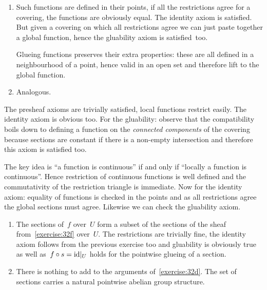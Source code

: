 \begin{exercise}
  \label{exercise:32d}
  \begin{enumerate}
    \item Such functions are defined in their points, if all the restrictions agree for a covering, the functions are obviously equal. The identity axiom is satisfied. But given a covering on which all restrictions agree we can just paste together a global function, hence the gluability axiom is satisfied~too.

      Glueing functions preserves their extra properties: these are all defined in a neighbourhood of a point, hence valid in an open set and therefore lift to the global function.

    \item Analogous.
  \end{enumerate}
\end{exercise}

\begin{exercise}
  The presheaf axioms are trivially satisfied, local functions restrict easily. The identity axiom is obvious too. For the gluability: observe that the compatibility boils down to defining a function on the \emph{connected components} of the covering because sections are constant if there is a non-empty intersection and therefore this axiom is satisfied too.
\end{exercise}

\begin{exercise}
  \label{exercise:32f}
 The key idea is ``a function is continuous'' if and only if ``locally a function is continuous''. Hence restriction of continuous functions is well defined and the commutativity of the restriction triangle is immediate. Now for the identity axiom: equality of functions is checked in the points and as all restrictions agree the global sections must agree. Likewise we can check the gluability axiom.
\end{exercise}

\begin{exercise}
  \begin{enumerate}
    \item The sections of~$f$ over~$U$ form a subset of the sections of the sheaf from~\autoref{exercise:32f} over~$U$. The restrictions are trivially fine, the identity axiom follows from the previous exercise too and gluability is obviously true as well as~$f\circ s=\mathrm{id}|_U$ holds for the pointwise glueing of a section.

    \item There is nothing to add to the arguments of~\autoref{exercise:32d}. The set of sections carries a natural pointwise abelian group structure.
  \end{enumerate}
\end{exercise}


